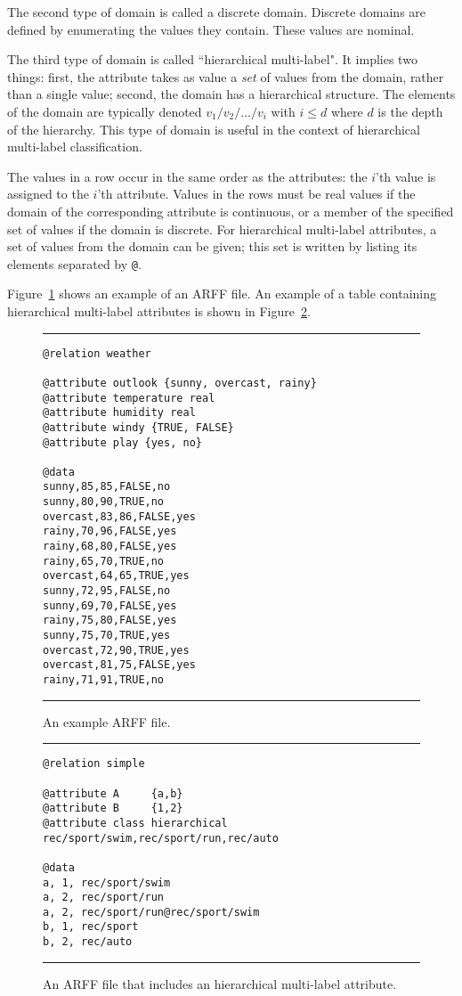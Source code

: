 The second type of domain is called a discrete domain.  Discrete domains are defined by enumerating the values they contain.  These values are nominal.

The third type of domain is called ``hierarchical multi-label".  It implies two things: first, the attribute takes as value a {\em set} of values from the domain, rather than a single value; second, the domain has a hierarchical structure.  The elements of the domain are typically denoted $v_1/v_2/.../v_i$ with $i \leq d$ where $d$ is the depth of the hierarchy.  This type of domain is useful in the context of hierarchical multi-label classification.  

The values in a	 row occur in the same order as the attributes: the $i$'th value is assigned to the $i$'th attribute.  Values in the rows must be real values if the domain of the corresponding attribute is continuous, or a member of the specified set of values if the domain is discrete.  For hierarchical multi-label attributes, a set of values from the domain can be given; this set is written by listing its elements separated by \verb^@^.

Figure~\ref{arff:fig} shows an example of an ARFF file.  An example of a table containing hierarchical multi-label attributes is shown in Figure~\ref{arffhmc:fig}.

\begin{figure}
\hrule
\begin{verbatim}
@relation weather

@attribute outlook {sunny, overcast, rainy}
@attribute temperature real
@attribute humidity real
@attribute windy {TRUE, FALSE}
@attribute play {yes, no}

@data
sunny,85,85,FALSE,no
sunny,80,90,TRUE,no
overcast,83,86,FALSE,yes
rainy,70,96,FALSE,yes
rainy,68,80,FALSE,yes
rainy,65,70,TRUE,no
overcast,64,65,TRUE,yes
sunny,72,95,FALSE,no
sunny,69,70,FALSE,yes
rainy,75,80,FALSE,yes
sunny,75,70,TRUE,yes
overcast,72,90,TRUE,yes
overcast,81,75,FALSE,yes
rainy,71,91,TRUE,no
\end{verbatim}
\hrule
\caption{An example ARFF file.}
\label{arff:fig}
\end{figure}


\begin{figure}
\hrule
\begin{verbatim}
@relation simple

@attribute A     {a,b}
@attribute B     {1,2}
@attribute class hierarchical rec/sport/swim,rec/sport/run,rec/auto

@data
a, 1, rec/sport/swim
a, 2, rec/sport/run
a, 2, rec/sport/run@rec/sport/swim
b, 1, rec/sport
b, 2, rec/auto
\end{verbatim}
\hrule
\caption{An ARFF file that includes an hierarchical multi-label attribute.}
\label{arffhmc:fig}
\end{figure}

